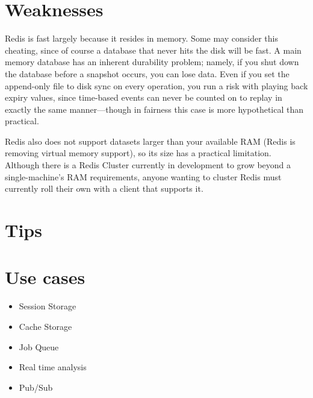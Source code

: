\section{Weaknesses}

Redis is fast largely because it resides in memory. Some may consider this cheating, since of course a database that never hits the disk will be fast. A main memory database has an inherent durability problem; namely, if you shut down the database before a snapshot occurs, you can lose data. Even if you set the append-only file to disk sync on every operation, you run a risk with playing back expiry values, since time-based events can never be counted on to replay in exactly the same manner—though in fairness this case is more hypothetical than practical.

Redis also does not support datasets larger than your available RAM (Redis is removing virtual memory support), so its size has a practical limitation. Although there is a Redis Cluster currently in development to grow beyond a single-machine’s RAM requirements, anyone wanting to cluster Redis must currently roll their own with a client that supports it.\cite{seven_databases}

\section{Tips}

\section{Use cases}

\begin{itemize}
  \item Session Storage
  \item Cache Storage
  \item Job Queue
  \item Real time analysis
  \item Pub/Sub
\end{itemize}